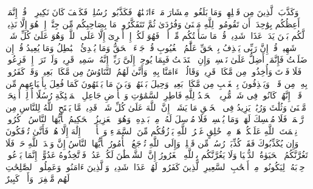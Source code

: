 \startbuffer[\q:34:45]
وَكَذَّبَ ٱلَّذِینَ مِن قَبۡلِهِمۡ وَمَا بَلَغُوا۟ مِعۡشَارَ مَاۤ ءَاتَیۡنَٰهُمۡ فَكَذَّبُوا۟ رُسُلِیۖ فَكَیۡفَ كَانَ نَكِیرِ%
\stopbuffer%
\startbuffer[\q:34:46]
۞ قُلۡ إِنَّمَاۤ أَعِظُكُم بِوَٰحِدَةٍۖ أَن تَقُومُوا۟ لِلَّهِ مَثۡنَىٰ وَفُرَٰدَىٰ ثُمَّ تَتَفَكَّرُوا۟ۚ مَا بِصَاحِبِكُم مِّن جِنَّةٍۚ إِنۡ هُوَ إِلَّا نَذِیرࣱ لَّكُم بَیۡنَ یَدَیۡ عَذَابࣲ شَدِیدࣲ%
\stopbuffer%
\startbuffer[\q:34:47]
قُلۡ مَا سَأَلۡتُكُم مِّنۡ أَجۡرࣲ فَهُوَ لَكُمۡۖ إِنۡ أَجۡرِیَ إِلَّا عَلَى ٱللَّهِۖ وَهُوَ عَلَىٰ كُلِّ شَیۡءࣲ شَهِیدࣱ%
\stopbuffer%
\startbuffer[\q:34:48]
قُلۡ إِنَّ رَبِّی یَقۡذِفُ بِٱلۡحَقِّ عَلَّٰمُ ٱلۡغُیُوبِ%
\stopbuffer%
\startbuffer[\q:34:49]
قُلۡ جَاۤءَ ٱلۡحَقُّ وَمَا یُبۡدِئُ ٱلۡبَٰطِلُ وَمَا یُعِیدُ%
\stopbuffer%
\startbuffer[\q:34:50]
قُلۡ إِن ضَلَلۡتُ فَإِنَّمَاۤ أَضِلُّ عَلَىٰ نَفۡسِیۖ وَإِنِ ٱهۡتَدَیۡتُ فَبِمَا یُوحِیۤ إِلَیَّ رَبِّیۤۚ إِنَّهُۥ سَمِیعࣱ قَرِیبࣱ%
\stopbuffer%
\startbuffer[\q:34:51]
وَلَوۡ تَرَىٰۤ إِذۡ فَزِعُوا۟ فَلَا فَوۡتَ وَأُخِذُوا۟ مِن مَّكَانࣲ قَرِیبࣲ%
\stopbuffer%
\startbuffer[\q:34:52]
وَقَالُوۤا۟ ءَامَنَّا بِهِۦ وَأَنَّىٰ لَهُمُ ٱلتَّنَاوُشُ مِن مَّكَانِۭ بَعِیدࣲ%
\stopbuffer%
\startbuffer[\q:34:53]
وَقَدۡ كَفَرُوا۟ بِهِۦ مِن قَبۡلُۖ وَیَقۡذِفُونَ بِٱلۡغَیۡبِ مِن مَّكَانِۭ بَعِیدࣲ%
\stopbuffer%
\startbuffer[\q:34:54]
وَحِیلَ بَیۡنَهُمۡ وَبَیۡنَ مَا یَشۡتَهُونَ كَمَا فُعِلَ بِأَشۡیَاعِهِم مِّن قَبۡلُۚ إِنَّهُمۡ كَانُوا۟ فِی شَكࣲّ مُّرِیبِۭ%
\stopbuffer%
\startbuffer[\q:35:1]
ٱلۡحَمۡدُ لِلَّهِ فَاطِرِ ٱلسَّمَٰوَٰتِ وَٱلۡأَرۡضِ جَاعِلِ ٱلۡمَلَٰۤئِكَةِ رُسُلًا أُو۟لِیۤ أَجۡنِحَةࣲ مَّثۡنَىٰ وَثُلَٰثَ وَرُبَٰعَۚ یَزِیدُ فِی ٱلۡخَلۡقِ مَا یَشَاۤءُۚ إِنَّ ٱللَّهَ عَلَىٰ كُلِّ شَیۡءࣲ قَدِیرࣱ%
\stopbuffer%
\startbuffer[\q:35:2]
مَّا یَفۡتَحِ ٱللَّهُ لِلنَّاسِ مِن رَّحۡمَةࣲ فَلَا مُمۡسِكَ لَهَاۖ وَمَا یُمۡسِكۡ فَلَا مُرۡسِلَ لَهُۥ مِنۢ بَعۡدِهِۦۚ وَهُوَ ٱلۡعَزِیزُ ٱلۡحَكِیمُ%
\stopbuffer%
\startbuffer[\q:35:3]
یَٰۤأَیُّهَا ٱلنَّاسُ ٱذۡكُرُوا۟ نِعۡمَتَ ٱللَّهِ عَلَیۡكُمۡۚ هَلۡ مِنۡ خَٰلِقٍ غَیۡرُ ٱللَّهِ یَرۡزُقُكُم مِّنَ ٱلسَّمَاۤءِ وَٱلۡأَرۡضِۚ لَاۤ إِلَٰهَ إِلَّا هُوَۖ فَأَنَّىٰ تُؤۡفَكُونَ%
\stopbuffer%
\startbuffer[\q:35:4]
وَإِن یُكَذِّبُوكَ فَقَدۡ كُذِّبَتۡ رُسُلࣱ مِّن قَبۡلِكَۚ وَإِلَى ٱللَّهِ تُرۡجَعُ ٱلۡأُمُورُ%
\stopbuffer%
\startbuffer[\q:35:5]
یَٰۤأَیُّهَا ٱلنَّاسُ إِنَّ وَعۡدَ ٱللَّهِ حَقࣱّۖ فَلَا تَغُرَّنَّكُمُ ٱلۡحَیَوٰةُ ٱلدُّنۡیَا وَلَا یَغُرَّنَّكُم بِٱللَّهِ ٱلۡغَرُورُ%
\stopbuffer%
\startbuffer[\q:35:6]
إِنَّ ٱلشَّیۡطَٰنَ لَكُمۡ عَدُوࣱّ فَٱتَّخِذُوهُ عَدُوًّاۚ إِنَّمَا یَدۡعُوا۟ حِزۡبَهُۥ لِیَكُونُوا۟ مِنۡ أَصۡحَٰبِ ٱلسَّعِیرِ%
\stopbuffer%
\startbuffer[\q:35:7]
ٱلَّذِینَ كَفَرُوا۟ لَهُمۡ عَذَابࣱ شَدِیدࣱۖ وَٱلَّذِینَ ءَامَنُوا۟ وَعَمِلُوا۟ ٱلصَّٰلِحَٰتِ لَهُم مَّغۡفِرَةࣱ وَأَجۡرࣱ كَبِیرٌ%
